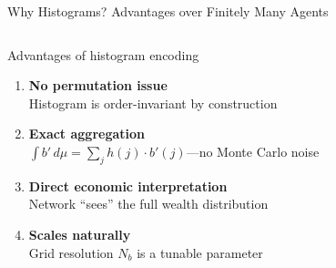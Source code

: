 \documentclass[aspectratio=169,11pt]{beamer}
\newcommand{\x}{\bm{x}}
\begin{document}
\begin{frame}{Why Histograms? Advantages over Finitely Many Agents}
\begin{columns}[T]
\begin{block}{Advantages of histogram encoding}
\begin{enumerate}
    \item \textbf{No permutation issue}\\
    {\small Histogram is order-invariant by construction}
    \item \textbf{Exact aggregation}\\
    {\small $\int b' \, d\mu = \sum_j h(j) \cdot b'(j)$---no Monte Carlo noise}
    \item \textbf{Direct economic interpretation}\\
    {\small Network ``sees'' the full wealth distribution}
    \item \textbf{Scales naturally}\\
    {\small Grid resolution $N_b$ is a tunable parameter}
\end{enumerate}
\end{block}

\begin{center}
\end{center}
\end{columns}
\end{frame}
\end{document}
